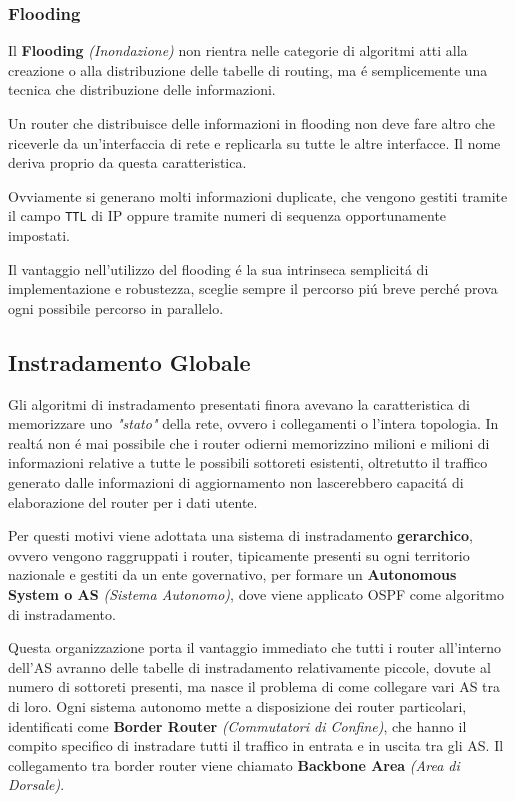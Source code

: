 \documentclass[12pt]{article}
\def\code#1{\texttt{#1}}
\begin{document}
\clearpage
\subsubsection{Flooding}\label{router-distribuzione-tabelle-routing-flooding}
Il \textbf{Flooding} \textit{(Inondazione)} non rientra nelle categorie di algoritmi atti alla creazione o alla 
distribuzione delle tabelle di routing, ma \'e semplicemente una tecnica che distribuzione delle informazioni.

Un router che distribuisce delle informazioni in flooding non deve fare altro che riceverle da un'interfaccia di rete e 
replicarla su tutte le altre interfacce. Il nome deriva proprio da questa caratteristica. 

Ovviamente si generano molti informazioni duplicate, che vengono gestiti tramite il campo \code{TTL} di IP oppure tramite 
numeri di sequenza opportunamente impostati.

Il vantaggio nell'utilizzo del flooding \'e la sua intrinseca semplicit\'a di implementazione e robustezza, sceglie sempre 
il percorso pi\'u breve perch\'e prova ogni possibile percorso in parallelo.

\subsection{Instradamento Globale}\label{router-instradamento-tra-as}
Gli algoritmi di instradamento presentati finora avevano la caratteristica di memorizzare uno \textit{"stato"} della rete, 
ovvero i collegamenti o l'intera topologia. In realt\'a non \'e mai possibile che i router odierni memorizzino milioni e 
milioni di informazioni relative a tutte le possibili sottoreti esistenti, oltretutto il traffico generato dalle 
informazioni di aggiornamento non lascerebbero capacit\'a di elaborazione del router per i dati utente.

Per questi motivi viene adottata una sistema di instradamento \textbf{gerarchico}, ovvero vengono raggruppati i router, 
tipicamente presenti su ogni territorio nazionale e gestiti da un ente governativo, per formare un \textbf{Autonomous 
System o AS} \textit{(Sistema Autonomo)}, dove viene applicato OSPF come algoritmo di instradamento.

Questa organizzazione porta il vantaggio immediato che tutti i router all'interno dell'AS avranno delle tabelle 
di instradamento relativamente piccole, dovute al numero di sottoreti presenti, ma nasce il problema di come collegare vari 
AS tra di loro. Ogni sistema autonomo mette a disposizione dei router particolari, identificati come \textbf{Border Router} 
\textit{(Commutatori di Confine)}, che hanno il compito specifico di instradare tutti il traffico in entrata e in uscita 
tra gli AS. Il collegamento tra border router viene chiamato \textbf{Backbone Area} \textit{(Area di Dorsale)}.
\end{document}
